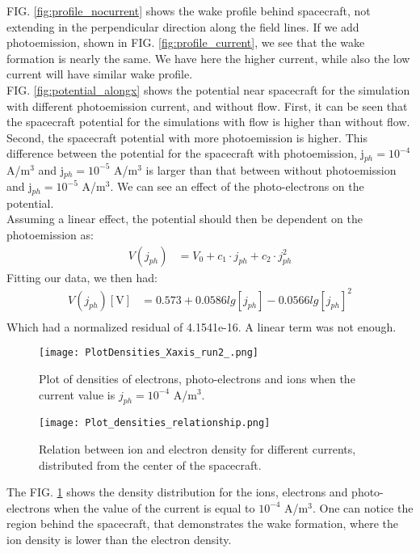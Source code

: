 \documentclass[aip, 
rsi, 
amsmath,
amssymb,
longbibliography,
preprint]{revtex4-1}
\begin{document}
FIG. \ref{fig:profile_nocurrent} shows the wake profile behind spacecraft, not extending in the perpendicular direction along the field lines. If we add photoemission,  shown in FIG. \ref{fig:profile_current}, we see that the wake formation is nearly the same. We have here the higher current, while also the low current will have similar wake profile.\\

FIG. \ref{fig:potential_alongx} shows the potential near spacecraft for the simulation with different photoemission current, and without flow. First, it can be seen that the spacecraft potential for the simulations with flow is higher than without flow. Second, the spacecraft potential with more photoemission is higher. This difference between the potential for the spacecraft  with photoemission, j$_{ph} = 10^{-4}$ A/m$^3$ and  j$_{ph} = 10^{-5}$ A/m$^3$ is larger than that between without photoemission and  j$_{ph} = 10^{-5}$ A/m$^3$. We can see an effect of the photo-electrons on the potential.\\

Assuming a linear effect, the potential should then be dependent on the photoemission as:
\begin{align*}
V\left(j_{ph}\right) &= V_0 + c_1\cdot j_{ph} + c_2\cdot j_{ph}^2
\end{align*}
Fitting our data, we then had:
\begin{align*}
V\left(j_{ph}\right) \left[\text{V}\right]&= 0.573 + 0.0586 lg\left[j_{ph}\right] - 0.0566 lg\left[j_{ph}\right]^2\\
\end{align*}
Which had a normalized residual of 4.1541e-16. A linear term was not enough.\\

\begin{figure}
\texttt{[image: PlotDensities\_Xaxis\_run2\_.png]}
\caption{\label{fig:densityCurrent}Plot of densities of electrons, photo-electrons and ions when the current value is \(j_{ph} = 10^{-4}\) A/m$^3$.}
\end{figure}

\begin{figure}
\texttt{[image: Plot\_densities\_relationship.png]}
\caption{\label{fig:densityCurrentRelation}Relation between ion and electron density for different currents, distributed from the center of the spacecraft.}
\end{figure}

The FIG. \ref{fig:densityCurrent} shows the density distribution for the ions, electrons and photo-electrons when the value of the current is equal to $10^{-4}$ A/m$^3$. One can notice the region behind the spacecraft, that demonstrates the wake formation, where the ion density is lower than the electron density.\par
\end{document}
